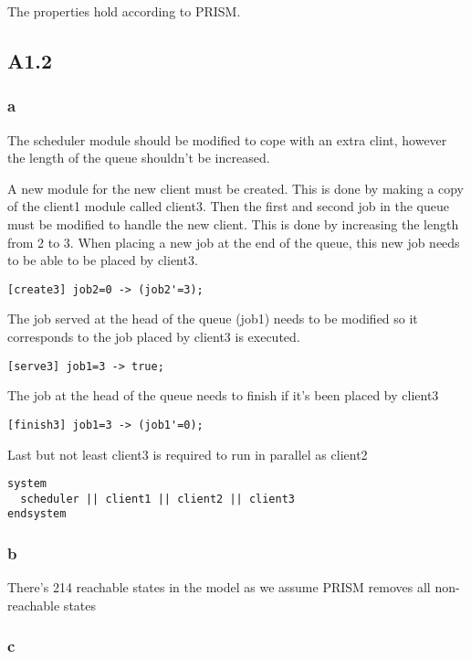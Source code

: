 The properties hold according to PRISM.

\subsection{A1.2}

\subsubsection{a}

The scheduler module should be modified
to cope with an extra clint, however the length of
the queue shouldn't be increased.

A new module for the new client must be created. This is
done by making a copy of the client1 module called client3.
Then the first and second job in the queue must be modified
to handle the new client. This is done by increasing the length
from 2 to 3. When placing a new job at the end of the queue, this
new job needs to be able to be placed by client3.

\begin{verbatim}
[create3] job2=0 -> (job2'=3);
\end{verbatim}

The job served at the head of the queue (job1) needs to be modified
so it corresponds to the job placed by client3 is executed.

\begin{verbatim}
[serve3] job1=3 -> true;
\end{verbatim}

The job at the head of the queue needs to finish if it's been placed
by client3

\begin{verbatim}
[finish3] job1=3 -> (job1'=0);
\end{verbatim}

Last but not least client3 is required to run in parallel as client2

\begin{verbatim}
system
  scheduler || client1 || client2 || client3
endsystem
\end{verbatim}

\subsubsection{b}

There's 214 reachable states in the model as we assume PRISM removes all non-reachable states

\subsubsection{c}

